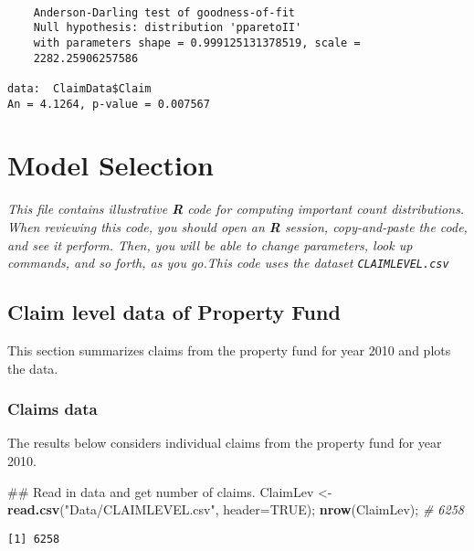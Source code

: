 \documentclass[]{book}
\newenvironment{Shaded}{\begin{snugshade}}{\end{snugshade}}
\newcommand{\KeywordTok}[1]{\textcolor[rgb]{0.13,0.29,0.53}{\textbf{#1}}}
\newcommand{\DataTypeTok}[1]{\textcolor[rgb]{0.13,0.29,0.53}{#1}}
\newcommand{\StringTok}[1]{\textcolor[rgb]{0.31,0.60,0.02}{#1}}
\newcommand{\CommentTok}[1]{\textcolor[rgb]{0.56,0.35,0.01}{\textit{#1}}}
\newcommand{\OtherTok}[1]{\textcolor[rgb]{0.56,0.35,0.01}{#1}}
\newcommand{\NormalTok}[1]{#1}
\theoremstyle{definition}
\theoremstyle{definition}
\theoremstyle{definition}
\theoremstyle{remark}
\begin{document}
\begin{verbatim}

    Anderson-Darling test of goodness-of-fit
    Null hypothesis: distribution 'pparetoII'
    with parameters shape = 0.999125131378519, scale =
    2282.25906257586

data:  ClaimData$Claim
An = 4.1264, p-value = 0.007567
\end{verbatim}

\chapter{Model Selection}\label{model-selection}

\emph{This file contains illustrative \textbf{R} code for computing
important count distributions. When reviewing this code, you should open
an \textbf{R} session, copy-and-paste the code, and see it perform.
Then, you will be able to change parameters, look up commands, and so
forth, as you go.This code uses the dataset \texttt{CLAIMLEVEL.csv} }

\section{Claim level data of Property
Fund}\label{claim-level-data-of-property-fund}

This section summarizes claims from the property fund for year 2010 and
plots the data.

\subsection{Claims data}\label{claims-data}

The results below considers individual claims from the property fund for
year 2010.

\begin{Shaded}
\begin{Highlighting}[]
\NormalTok{## Read in data and get number of claims.  }
\NormalTok{ClaimLev <-}\StringTok{ }\KeywordTok{read.csv}\NormalTok{(}\StringTok{"Data/CLAIMLEVEL.csv"}\NormalTok{, }\DataTypeTok{header=}\OtherTok{TRUE}\NormalTok{); }\KeywordTok{nrow}\NormalTok{(ClaimLev); }\CommentTok{# 6258}
\end{Highlighting}
\end{Shaded}

\begin{verbatim}
[1] 6258
\end{verbatim}
\end{document}
